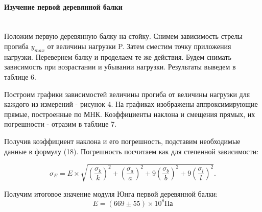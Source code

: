 \documentclass[a4paper,12pt]{report}
\begin{document}
\paragraph*{Изучение первой деревянной балки} \textbf{ }
\\

Положим первую деревянную балку на стойку. Снимем зависимость стрелы прогиба $y_{max}$ от величины нагрузки P. Затем сместим точку приложения нагрузки. Перевернем балку и проделаем те же действия. Будем снимать зависимость при возрастании и убывании нагрузки. Результаты выведем в таблице 6.

Построим графики зависимостей величины прогиба от величины нагрузки для каждого из измерений - рисунок 4. На графиках изображены аппроксимирующие прямые, построенные по МНК. Коэффициенты наклона и смещения прямых, их погрешности - отразим в таблице 7.

Получив коэффициент наклона и его погрешность, подставим необходимые данные в формулу (18). Погрешность посчитаем как для степенной зависимости:

	\[\sigma_E=E\times \sqrt{(\frac{\sigma_k}{k})^2+(\frac{\sigma_a}{a})^2+9(\frac{\sigma_b}{b})^2+9(\frac{\sigma_l}{l})^2}. \]

Получим итоговое значение модуля Юнга первой деревянной балки:
	\[E = (669\pm55)\times 10^8  \textbf{Па} \]
\end{document}
